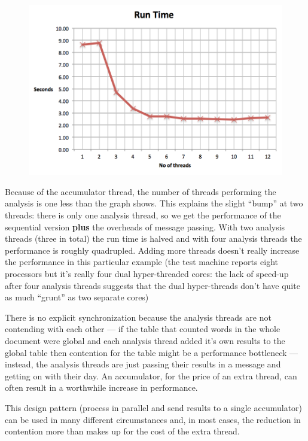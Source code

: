 \begin{figure}[h]
{\includegraphics[scale=0.75]{ub-img/threadPerformance.png}}
\end{figure}

Because of the accumulator thread, the number of threads performing
the analysis is one less than the graph shows. This explains the
slight ``bump'' at two threads: there is only one analysis thread, so
we get the performance of the sequential version {\bf plus} the
overheads of message passing. With two analysis threads (three in
total) the run time is halved and with four analysis threads the
performance is roughly quadrupled. Adding more threads doesn't really
increase the performance in this particular example (the test machine
reports eight processors but it's really four dual hyper-threaded cores: the
lack of speed-up after four analysis threads suggests that the dual
hyper-threads don't have quite as much ``grunt'' as two separate cores)

There is no explicit synchronization because the analysis threads are not
contending with each other --- if the table that counted words in the whole
document were global and each analysis thread added it's own results to the
global table then contention for the table might be a performance bottleneck ---
instead, the analysis threads are just passing their results in a message and
getting on with their day. An accumulator, for the price of an extra
thread, can often result in a worthwhile increase in performance.

This design pattern (process in parallel and send results to a single
accumulator) can be used in many different circumstances and, in most cases, the
reduction in contention more than makes up for the cost of the extra
thread. 

